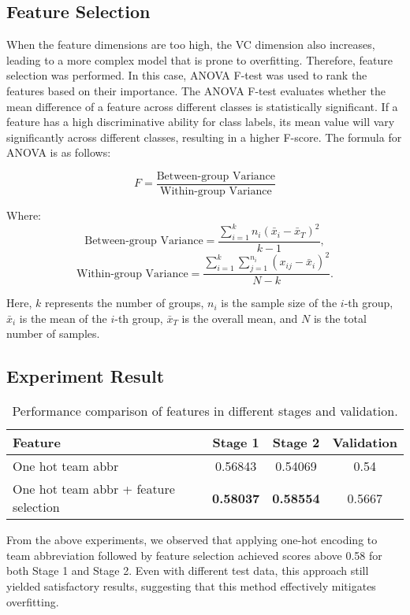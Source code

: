 \documentclass[12pt,a4paper]{article}
\begin{document}
\subsection{Feature Selection}  

When the feature dimensions are too high, the VC dimension also increases, leading to a more complex model that is prone to overfitting. Therefore, feature selection was performed. In this case, ANOVA F-test was used to rank the features based on their importance. The ANOVA F-test evaluates whether the mean difference of a feature across different classes is statistically significant. If a feature has a high discriminative ability for class labels, its mean value will vary significantly across different classes, resulting in a higher F-score. The formula for ANOVA is as follows:

\[
F = \frac{\text{Between-group Variance}}{\text{Within-group Variance}}
\]

Where:
\[
\text{Between-group Variance} = \frac{\sum_{i=1}^{k} n_i (\bar{x}_i - \bar{x}_T)^2}{k-1},
\]
\[
\text{Within-group Variance} = \frac{\sum_{i=1}^{k} \sum_{j=1}^{n_i} (x_{ij} - \bar{x}_i)^2}{N-k}.
\]

Here, \( k \) represents the number of groups, \( n_i \) is the sample size of the \( i \)-th group, \( \bar{x}_i \) is the mean of the \( i \)-th group, \( \bar{x}_T \) is the overall mean, and \( N \) is the total number of samples.

\subsection{Experiment Result}  

\begin{table}[h!]
\centering
\begin{tabular}{lccc}
\toprule
\textbf{Feature} & \textbf{Stage 1} & \textbf{Stage 2} & \textbf{Validation} \\ 
\midrule
One hot team abbr & 0.56843 & 0.54069 & 0.54 \\ 
One hot team abbr + feature selection & \textbf{0.58037} & \textbf{0.58554} & 0.5667 \\ 
\bottomrule
\end{tabular}
\caption{Performance comparison of features in different stages and validation.}
\label{tab:final_results}
\end{table}

From the above experiments, we observed that applying one-hot encoding to team abbreviation followed by feature selection achieved scores above 0.58 for both Stage 1 and Stage 2. Even with different test data, this approach still yielded satisfactory results, suggesting that this method effectively mitigates overfitting.
\end{document}
